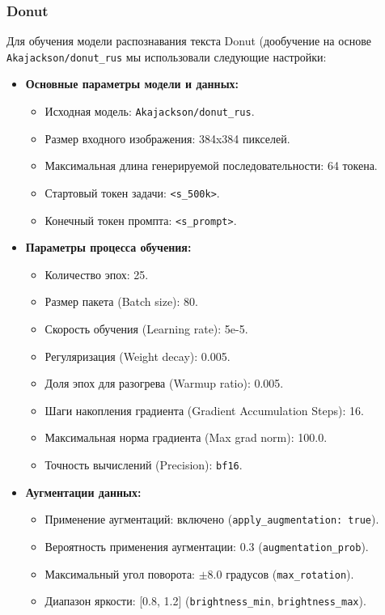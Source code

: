 \documentclass[12pt, a4paper]{article}
\theoremstyle{definition}
\theoremstyle{remark}
\begin{document}
	\subsubsection{Donut}
	Для обучения модели распознавания текста Donut (дообучение на основе \texttt{Akajackson/donut\_rus} мы использовали следующие настройки:
	\begin{itemize}
		\item \textbf{Основные параметры модели и данных:}
		\begin{itemize}
			\item Исходная модель: \texttt{Akajackson/donut\_rus}.
			\item Размер входного изображения: 384x384 пикселей.
			\item Максимальная длина генерируемой последовательности: 64 токена.
			\item Стартовый токен задачи: \texttt{<s\_500k>}.
			\item Конечный токен промпта: \texttt{<s\_prompt>}.
		\end{itemize}
		\item \textbf{Параметры процесса обучения:}
		\begin{itemize}
			\item Количество эпох: 25.
			\item Размер пакета (Batch size): 80.
			\item Скорость обучения (Learning rate): 5e-5.
			\item Регуляризация (Weight decay): 0.005.
			\item Доля эпох для разогрева (Warmup ratio): 0.005.
			\item Шаги накопления градиента (Gradient Accumulation Steps): 16.
			\item Максимальная норма градиента (Max grad norm): 100.0.
			\item Точность вычислений (Precision): \texttt{bf16}.
		\end{itemize}
		\item \textbf{Аугментации данных:}
		\begin{itemize}
			\item Применение аугментаций: включено (\texttt{apply\_augmentation: true}).
			\item Вероятность применения аугментации: 0.3 (\texttt{augmentation\_prob}).
			\item Максимальный угол поворота: $\pm$8.0 градусов (\texttt{max\_rotation}).
			\item Диапазон яркости: [0.8, 1.2] (\texttt{brightness\_min}, \texttt{brightness\_max}).

\end{itemize}
\end{itemize}
\end{document}
